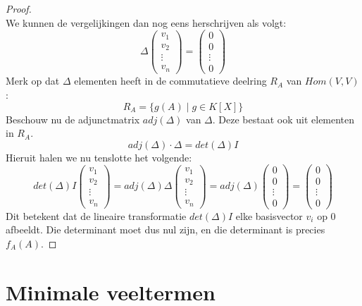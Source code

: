 \documentclass[main.tex]{subfiles}
\begin{document}
\begin{st}
\begin{proof}
\[    \]
    We kunnen de vergelijkingen dan nog eens herschrijven als volgt:
    \[ \Delta
    \begin{pmatrix}
      v_{1}\\ v_{2}\\ \vdots \\ v_{n}
    \end{pmatrix}
    =
    \begin{pmatrix}
      0\\ 0\\ \vdots \\ 0
    \end{pmatrix}
    \]
    Merk op dat $\Delta$ elementen heeft in de commutatieve deelring $R_{A}$ van $Hom(V,V)$:
    \[ R_{A} = \{g(A) \mid g \in K[X]\} \]
    Beschouw nu de adjunctmatrix $adj(\Delta)$ van $\Delta$.
    Deze bestaat ook uit elementen in $R_{A}$.
    \[
    adj(\Delta) \cdot \Delta = det(\Delta)I
    \]
    Hieruit halen we nu tenslotte het volgende:
    \[ det(\Delta)I 
    \begin{pmatrix}
      v_{1}\\ v_{2}\\ \vdots \\ v_{n}
    \end{pmatrix}
    = adj(\Delta)\Delta 
    \begin{pmatrix}
      v_{1}\\ v_{2}\\ \vdots \\ v_{n}
    \end{pmatrix}
    = adj(\Delta)
    \begin{pmatrix}
      0\\ 0\\ \vdots \\ 0
    \end{pmatrix}
    =
    \begin{pmatrix}
      0\\ 0\\ \vdots \\ 0
    \end{pmatrix}
    \]
    Dit betekent dat de lineaire transformatie $det(\Delta)I$ elke basisvector $v_{i}$ op $0$ afbeeldt.
    Die determinant moet dus nul zijn, en die determinant is precies $f_{A}(A)$.
  \end{proof}
\end{st}

\section{Minimale veeltermen}
\label{sec:minimale-veeltermen}
\end{document}
